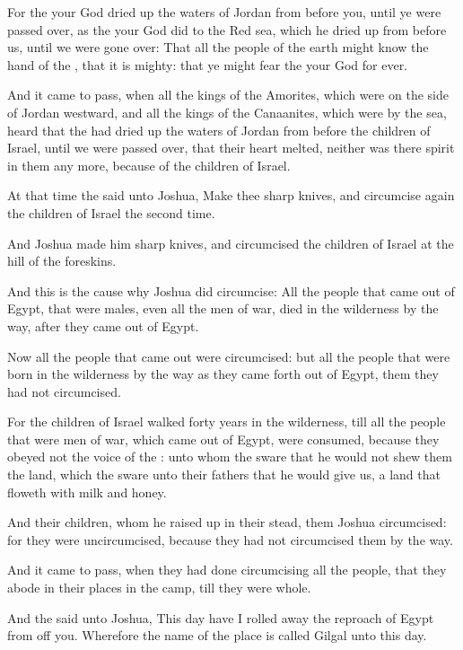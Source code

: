 \Verse For the \LORD your God dried up the waters of Jordan from before you, until ye were passed over, as the \LORD your God did to the Red sea, which he dried up from before us, until we were gone over: \Verse That all the people of the earth might know the hand of the \LORD, that it is mighty: that ye might fear the \LORD your God for ever.


\Chapter
\Verse And it came to pass, when all the kings of the Amorites, which were on the side of Jordan westward, and all the kings of the Canaanites, which were by the sea, heard that the \LORD had dried up the waters of Jordan from before the children of Israel, until we were passed over, that their heart melted, neither was there spirit in them any more, because of the children of Israel.

\Verse At that time the \LORD said unto Joshua, Make thee sharp knives, and circumcise again the children of Israel the second time.

\Verse And Joshua made him sharp knives, and circumcised the children of Israel at the hill of the foreskins.

\Verse And this is the cause why Joshua did circumcise: All the people that came out of Egypt, that were males, even all the men of war, died in the wilderness by the way, after they came out of Egypt.

\Verse Now all the people that came out were circumcised: but all the people that were born in the wilderness by the way as they came forth out of Egypt, them they had not circumcised.

\Verse For the children of Israel walked forty years in the wilderness, till all the people that were men of war, which came out of Egypt, were consumed, because they obeyed not the voice of the \LORD: unto whom the \LORD sware that he would not shew them the land, which the \LORD sware unto their fathers that he would give us, a land that floweth with milk and honey.

\Verse And their children, whom he raised up in their stead, them Joshua circumcised: for they were uncircumcised, because they had not circumcised them by the way.

\Verse And it came to pass, when they had done circumcising all the people, that they abode in their places in the camp, till they were whole.

\Verse And the \LORD said unto Joshua, This day have I rolled away the reproach of Egypt from off you. Wherefore the name of the place is called Gilgal unto this day.

